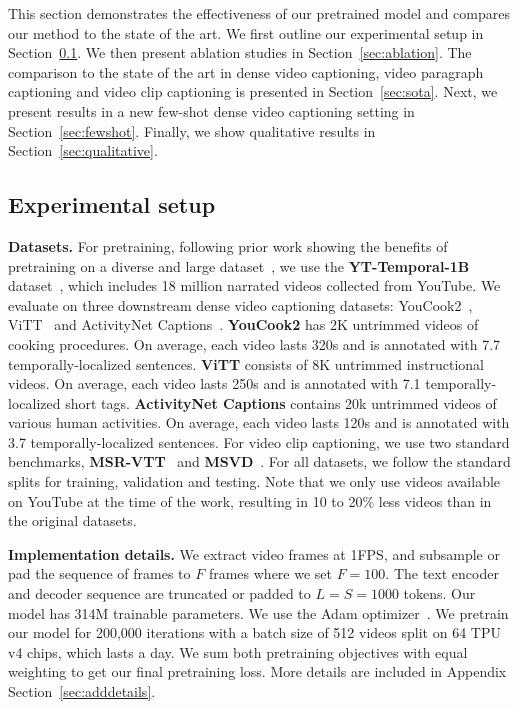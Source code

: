\vspace{-0.1cm}

This section demonstrates the effectiveness of our pretrained \model{} model and compares our method to the state of the art.
We first outline our experimental setup in Section~\ref{sec:setup}.
We then present ablation studies in Section~\ref{sec:ablation}.
The comparison to the state of the art in dense video captioning, video paragraph captioning and video clip captioning is presented in Section~\ref{sec:sota}. 
Next, we present results in a new few-shot dense video captioning setting in Section~\ref{sec:fewshot}. 
Finally, we show qualitative results in Section~\ref{sec:qualitative}. 

\subsection{Experimental setup}\label{sec:setup}
\vspace{-0.1cm}


\noindent \textbf{Datasets.} 
For pretraining, following prior work showing the benefits of pretraining on a diverse and large dataset~\cite{zellers2021merlot}, we use the \textbf{YT-Temporal-1B} dataset~\cite{zellers2022merlot}, which includes 18 million narrated videos collected from YouTube.
We evaluate \model{} on three downstream dense video captioning datasets: YouCook2~\cite{youcook2}, ViTT~\cite{huang2020multimodal} and ActivityNet Captions~\cite{krishna2017dense}.
\textbf{YouCook2} has 2K untrimmed videos of cooking procedures.
On average, each video lasts 320s and is annotated with 7.7 temporally-localized sentences.
\textbf{ViTT} consists of 8K untrimmed instructional videos.
On average, each video lasts 250s and is annotated with 7.1 temporally-localized short tags.
\textbf{ActivityNet Captions} contains 20k untrimmed videos of various human activities.
On average, each video lasts 120s and is annotated with 3.7 temporally-localized sentences. 
For video clip captioning, we use two standard benchmarks, \textbf{MSR-VTT}~\cite{xu16msrvtt} and \textbf{MSVD}~\cite{chen2011collecting}.
For all datasets, we follow the standard splits for training, validation and testing.
Note that we only use videos available on YouTube at the time of the work, resulting in 10 to 20\% less videos than in the original datasets.

\noindent \textbf{Implementation details.} 
We extract video frames at 1FPS, and subsample or pad the sequence of frames to $F$ frames where we set $F=100$.
The text encoder and decoder sequence are truncated or padded to $L=S=1000$ tokens.
Our model has 314M trainable parameters.
We use the Adam optimizer~\cite{kingma15adam}.
We pretrain our model for 200,000 iterations with a batch size of 512 videos split on 64 TPU v4 chips, which lasts a day.
We sum both pretraining objectives with equal weighting to get our final pretraining loss.
More details are included in Appendix Section~\ref{sec:adddetails}.

